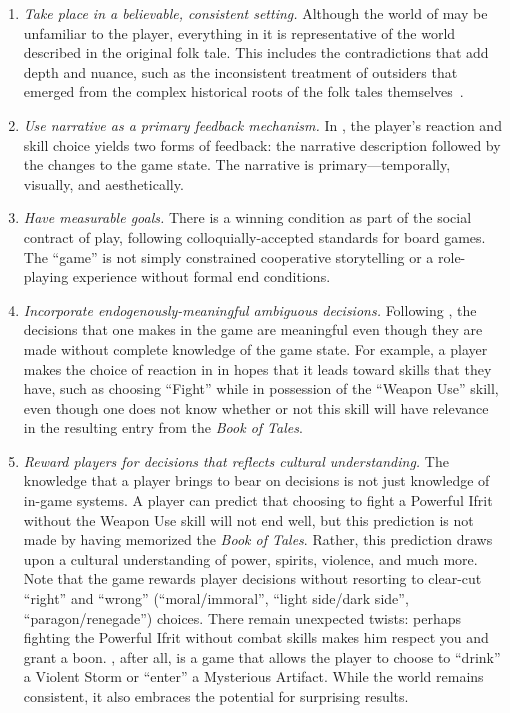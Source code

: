 \documentclass[a4paper]{article}
\begin{document}
\begin{enumerate}
\item \textit{Take place in a believable, consistent setting.} 
 Although the world of \totan{} may be unfamiliar to the player,
 everything in it is representative of the world described in the original
 folk tale.
 This includes the contradictions that add depth and nuance, such as 
 the inconsistent treatment of outsiders that emerged from the 
 complex historical roots of the folk tales themselves~\citep{Matar2008}.

\item \textit{Use narrative as a primary feedback mechanism.} 
 In \totan{}, the player's reaction and skill choice yields two forms
 of feedback: the narrative description followed by the changes to the
 game state. The narrative is primary---temporally, visually, and aesthetically.

\item \textit{Have measurable goals.} There is a winning condition as part
 of the social contract of play, following colloquially-accepted 
 standards for board games. The ``game'' is not simply constrained
 cooperative storytelling or a role-playing experience without formal end
 conditions. 

\item \textit{Incorporate endogenously-meaningful ambiguous decisions.}
 Following \citet{Burgun2012}, the decisions that one makes in the game
 are meaningful even though they are made without complete knowledge
 of the game state. For example, a player makes 
 the choice of reaction in \totan{} in hopes that it leads toward skills
 that they have, such as choosing ``Fight'' while in possession of the
 ``Weapon Use'' skill, even though one does not know whether or not
 this skill will have relevance in the resulting entry from the
 \textit{Book of Tales}.

\item \textit{Reward players for decisions that reflects
    cultural understanding.}  The knowledge that a player brings to
  bear on decisions is not just knowledge of in-game systems. 
  A player can predict that choosing to fight a Powerful Ifrit 
 without the Weapon Use skill will not end well,
  but this prediction is not made by having memorized the 
  \textit{Book of Tales}.
  Rather, this prediction draws upon a cultural understanding of power,
  spirits, violence, and much more.
  Note that the game rewards player decisions without resorting to
  clear-cut ``right'' and ``wrong'' (``moral/immoral'',
  ``light side/dark side'', ``paragon/renegade'') choices.  There
  remain unexpected twists: perhaps fighting the Powerful Ifrit without
  combat skills makes him respect you and grant a boon.  \totan{},
  after all, is a game that allows the player to choose to ``drink'' a
  Violent Storm or ``enter'' a Mysterious Artifact.  While the world
  remains consistent, it also embraces the potential for surprising
  results.

\end{enumerate}
\end{document}
